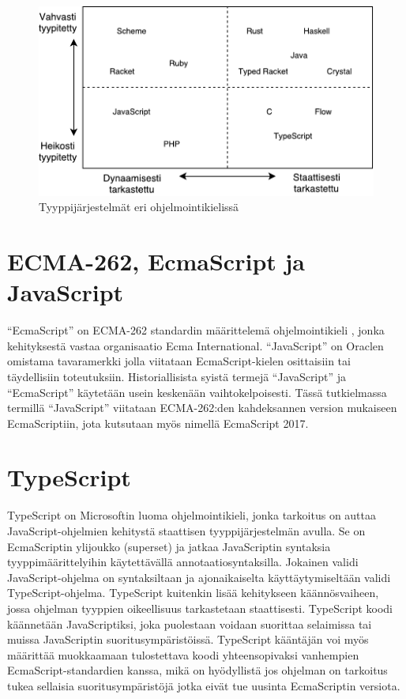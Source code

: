 \begin{figure}
\centering
\includegraphics{images/type-systems.pdf}
\caption{Tyyppijärjestelmät eri ohjelmointikielissä}
\end{figure}

\section{ECMA-262, EcmaScript ja JavaScript}
``EcmaScript'' on ECMA-262 standardin määrittelemä ohjelmointikieli
\cite{JavaScriptLanguageResources, Ecma262}, jonka kehityksestä vastaa
organisaatio Ecma International. ``JavaScript'' on Oraclen omistama
tavaramerkki jolla viitataan EcmaScript-kielen osittaisiin tai täydellisiin
toteutuksiin\cite{JavaScriptLanguageResources}. Historiallisista syistä termejä
``JavaScript'' ja ``EcmaScript'' käytetään usein keskenään vaihtokelpoisesti.
Tässä tutkielmassa termillä ``JavaScript'' viitataan ECMA-262:den kahdeksannen
version mukaiseen EcmaScriptiin, jota kutsutaan myös nimellä EcmaScript 2017.

\section{TypeScript}
TypeScript on Microsoftin luoma ohjelmointikieli, jonka tarkoitus on
auttaa JavaScript-ohjelmien kehitystä staattisen tyyppijärjestelmän avulla.
Se on EcmaScriptin ylijoukko (superset) \cite{TypeScriptSpec} ja jatkaa
JavaScriptin syntaksia tyyppimäärittelyihin käytettävällä
annotaatiosyntaksilla. Jokainen validi JavaScript-ohjelma on syntaksiltaan ja
ajonaikaiselta käyttäytymiseltään validi TypeScript-ohjelma. TypeScript
kuitenkin lisää kehitykseen käännösvaiheen, jossa ohjelman tyyppien
oikeellisuus tarkastetaan staattisesti. TypeScript koodi käännetään
JavaScriptiksi, joka puolestaan voidaan suorittaa selaimissa tai muissa
JavaScriptin suoritusympäristöissä. TypeScript kääntäjän voi myös määrittää
muokkaamaan tulostettava koodi yhteensopivaksi vanhempien
EcmaScript-standardien kanssa, mikä on hyödyllistä jos ohjelman on tarkoitus
tukea sellaisia suoritusympäristöjä jotka eivät tue uusinta EcmaScriptin
versiota.

